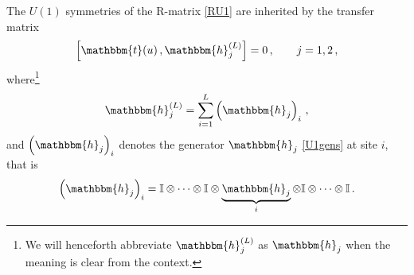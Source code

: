 \documentclass[12pt]{article}
\numberwithin{equation}{section}
\newcommand{\id}{\mathbb{I}}
\begin{document}
The $U(1)$ symmetries of the R-matrix \eqref{RU1}
are inherited by the transfer matrix
\begin{equation}
    \left[ \mathbbm{t}(u)\,, \mathbbm{h}_j^{(L)} \right] = 0 \,, \qquad j = 1, 2 \,,
    \label{U1transf}
\end{equation}
where\footnote{We will henceforth abbreviate $\mathbbm{h}_j^{(L)}$ as $\mathbbm{h}_j$ when the meaning is clear from the context.} 
\begin{equation}
   \mathbbm{h}_j^{(L)} = \sum_{i=1}^L \left( \mathbbm{h}_j \right)_i \,,
\end{equation}
and $\left( \mathbbm{h}_j \right)_i$ denotes the generator $\mathbbm{h}_j$ \eqref{U1gens} at site $i$, that is
\begin{equation}
    \left( \mathbbm{h}_j \right)_i = \id \otimes  \cdots \otimes \id \otimes \underbrace{\mathbbm{h}_j}_{i} \otimes \id \otimes \cdots \otimes\id \,.
\end{equation}
\end{document}
